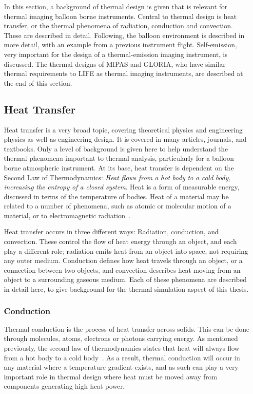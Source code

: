 In this section, a background of thermal design is given that is relevant for thermal imaging balloon borne instruments. Central to thermal design is heat transfer, or the thermal phenomena of radiation, conduction and convection. These are described in detail. Following, the balloon environment is described in more detail, with an example from a previous instrument flight. Self-emission, very important for the design of a thermal-emission imaging instrument, is discussed. The thermal designs of MIPAS and GLORIA, who have similar thermal requirements to LIFE as thermal imaging instruments, are described at the end of this section.

\subsection{Heat Transfer}
Heat transfer is a very broad topic, covering theoretical physics and engineering physics as well as engineering design. It is covered in many articles, journals, and textbooks. Only a level of background is given here to help understand the thermal phenomena important to thermal analysis, particularly for a balloon-borne atmospheric instrument. At its base, heat transfer is dependent on the Second Law of Thermodynamics: \textit{Heat flows from a hot body to a cold body, increasing the entropy of a closed system}. Heat is a form of measurable energy, discussed in terms of the temperature of bodies. Heat of a material may be related to a number of phenomena, such as atomic or molecular motion of a material, or to electromagnetic radiation~\citep{Heat_Transfer_telescope}.

Heat transfer occurs in three different ways: Radiation, conduction, and convection. These control the flow of heat energy through an object, and each play a different role; radiation emits heat from an object into space, not requiring any outer medium. Conduction defines how heat travels through an object, or a connection between two objects, and convection describes heat moving from an object to a surrounding gaseous medium. Each of these phenomena are described in detail here, to give background for the thermal simulation aspect of this thesis.

\subsubsection{Conduction}
Thermal conduction is the process of heat transfer across solids. This can be done through molecules, atoms, electrons or photons carrying energy. As mentioned previously, the second law of thermodynamics states that heat will always flow from a hot body to a cold body~\citep{Heat_Transfer_Basics}. As a result, thermal conduction will occur in any material where a temperature gradient exists, and as such can play a very important role in thermal design where heat must be moved away from components generating high heat power.

